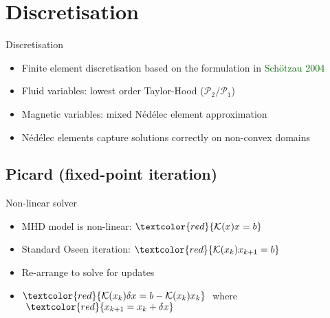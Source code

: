 \documentclass{beamer}
\newcommand{\gr}[1]{\textcolor{darkgreen} {#1}}
\newcommand{\re}[1]{{\textcolor{red}       {#1}}}
\begin{document}
\section{Discretisation}
\begin{frame}{Discretisation}

\begin{itemize}
  \item Finite element discretisation based on the formulation in \gr{Sch{\"o}tzau 2004}
  \item Fluid variables: lowest order Taylor-Hood (${\mathcal P_2}/{\mathcal P_1}$)
  \item Magnetic variables: mixed {N\'{e}d\'{e}lec} element approximation
  \item {N\'{e}d\'{e}lec} elements capture solutions correctly on non-convex domains
\end{itemize}



\end{frame}
\subsection{Picard (fixed-point iteration)}
\begin{frame}{Non-linear solver}
\begin{itemize}
  \item MHD model is non-linear: $\re{\mathcal{K}(x) x = b}$

  \item Standard Oseen iteration: $\re{\mathcal{K}(x_k) x_{k+1} = b}$

 \item Re-arrange to solve for updates

  \item $\re{\mathcal{K}(x_k) \delta x = b - \mathcal{K}(x_k)x_k} \ $ where $ \ \re{x_{k+1} = x_k+\delta x}$
\end{itemize}


\end{frame}
\end{document}

